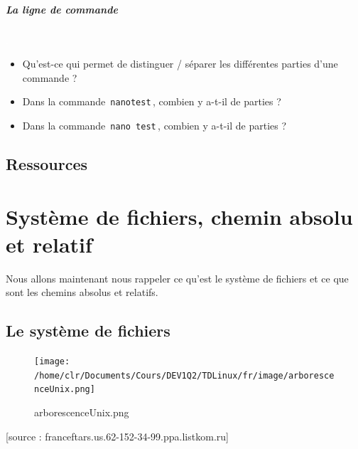 \documentclass[11pt,a4paper]{article}
\begin{document}
			
		\subparagraph{La ligne de commande} 
		
                \textcolor{white}{.} \par
            
					\begin{itemize}
				
			\item 
										Qu'est-ce qui permet de distinguer / s\'eparer les diff\'erentes parties d'une commande ? 
										 \textcolor{gray}{\underline{\hspace*{10em}}} 
			\item 
										Dans la commande \,\verb|nanotest|\,, combien y a-t-il de parties ?  
										 \textcolor{gray}{\underline{\hspace*{1em}}} 
			\item 
										Dans la commande \,\verb|nano test|\,, combien y a-t-il de parties ?  
										 \textcolor{gray}{\underline{\hspace*{1em}}} 
					\end{itemize}
				\subsection{Ressources}\section{Syst\`eme de fichiers, chemin absolu et relatif}
				Nous allons maintenant nous rappeler ce qu'est le syst\`eme de fichiers et ce que sont les chemins absolus et relatifs.
			
            \par
        \subsection{Le syst\`eme de fichiers}\begin{figure}[hbt]
				    \begin{center}
					\texttt{[image: /home/clr/Documents/Cours/DEV1Q2/TDLinux/fr/image/arborescenceUnix.png]}
						\end{center}
                
                    \caption[arborescenceUnix.png]{arborescenceUnix.png}
                \end{figure}
                    
			    
			    [source : franceftars.us.62-152-34-99.ppa.listkom.ru]
        
            \par
        
\end{document}
